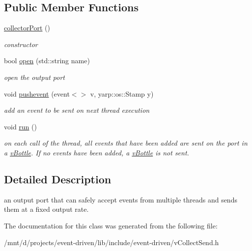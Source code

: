 \subsection*{Public Member Functions}
\begin{DoxyCompactItemize}
\item 
\mbox{\label{classev_1_1collectorPort_ac7cd1de9c40bd46df66b67ae824bb258}} 
\hyperlink{classev_1_1collectorPort_ac7cd1de9c40bd46df66b67ae824bb258}{collector\+Port} ()
\begin{DoxyCompactList}\small\item\em constructor \end{DoxyCompactList}\item 
\mbox{\label{classev_1_1collectorPort_a164072ae38c4e115873c451984b8e7f4}} 
bool \hyperlink{classev_1_1collectorPort_a164072ae38c4e115873c451984b8e7f4}{open} (std\+::string name)
\begin{DoxyCompactList}\small\item\em open the output port \end{DoxyCompactList}\item 
\mbox{\label{classev_1_1collectorPort_ab1d587f6b728b65b22df73bbe674607d}} 
void \hyperlink{classev_1_1collectorPort_ab1d587f6b728b65b22df73bbe674607d}{pushevent} (event$<$$>$ v, yarp\+::os\+::\+Stamp y)
\begin{DoxyCompactList}\small\item\em add an event to be sent on next thread execution \end{DoxyCompactList}\item 
\mbox{\label{classev_1_1collectorPort_a7ec227ae78ec71ca8867a20ae815ea7d}} 
void \hyperlink{classev_1_1collectorPort_a7ec227ae78ec71ca8867a20ae815ea7d}{run} ()
\begin{DoxyCompactList}\small\item\em on each call of the thread, all events that have been added are sent on the port in a \hyperlink{classev_1_1vBottle}{v\+Bottle}. If no events have been added, a \hyperlink{classev_1_1vBottle}{v\+Bottle} is not sent. \end{DoxyCompactList}\end{DoxyCompactItemize}


\subsection{Detailed Description}
an output port that can safely accept events from multiple threads and sends them at a fixed output rate. 

The documentation for this class was generated from the following file\+:\begin{DoxyCompactItemize}
\item 
/mnt/d/projects/event-\/driven/lib/include/event-\/driven/v\+Collect\+Send.\+h\end{DoxyCompactItemize}
